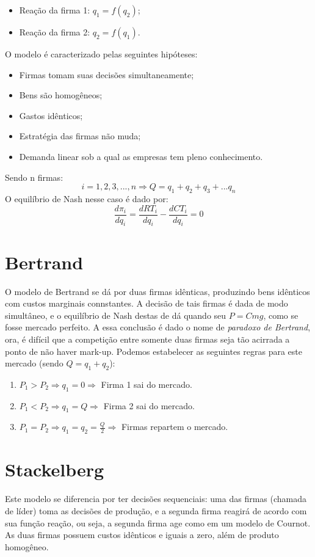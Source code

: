 \documentclass[12pt,a4paper,oneside,brazil]{abntex2}
\begin{document}
\begin{itemize}
\item Reação da firma 1: $q_1 = f(q_2)$;
\item Reação da firma 2: $q_2 = f(q_1)$.
\end{itemize}

O modelo é caracterizado pelas seguintes hipóteses:
\begin{itemize}
\item Firmas tomam suas decisões simultaneamente; 
\item Bens são homogêneos;
\item Gastos idênticos;
\item Estratégia das firmas não muda;
\item Demanda linear sob a qual as empresas tem pleno conhecimento.
\end{itemize}

Sendo n firmas:
\[ i = 1, 2 , 3, ..., n \Rightarrow Q = q_1 + q_2 + q_3 + ... q_n\]
O equilíbrio de Nash nesse caso é dado por:
\[  \frac{d \pi_i}{d q_i} = \frac{d RT_i}{d q_i} - \frac{d CT_i}{d q_i} = 0\]

\section{Bertrand}
O modelo de Bertrand se dá por duas firmas idênticas, produzindo bens idênticos com custos marginais connstantes. A decisão de tais firmas é dada de modo simultâneo,  e o equilíbrio de Nash destas de dá quando seu $P = Cmg$, como se fosse mercado perfeito. A essa conclusão é dado o nome de \emph{paradoxo de Bertrand}, ora, é difícil que a competição entre somente duas firmas seja tão acirrada a ponto de não haver mark-up. Podemos estabelecer as seguintes regras para este mercado (sendo $Q = q_1 + q_2$):
\begin{enumerate}
\item $P_1 > P_2  \Rightarrow q_1 = 0 \Rightarrow$ Firma 1 sai do mercado.
\item $P_1 <  P_2  \Rightarrow  q_1 = Q \Rightarrow$ Firma 2 sai do mercado.
\item $ P_1 = P_2 \Rightarrow q_1 = q_2 = \frac{Q}{2} \Rightarrow$ Firmas repartem o mercado.
\end{enumerate}

\section{Stackelberg}
Este modelo se diferencia por ter decisões sequenciais: uma das firmas (chamada de líder) toma as decisões de produção, e a segunda firma reagirá de acordo com sua função reação, ou seja, a segunda firma age como em um modelo de Cournot. As duas firmas possuem custos idênticos e iguais a zero, além de produto homogêneo. 
\end{document}
